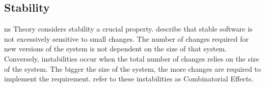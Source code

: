 \subsection{Stability} \label{subsec_on_stability}

\gls{ns} Theory considers stability a crucial property.
\textcite[269-270]{mannaert_normalized_2016} describe that stable software is not
excessively sensitive to small changes. The number of changes required for new versions of
the system is not dependent on the size of that system. Conversely, instabilities occur
when the total number of changes relies on the size of the system. The bigger the size of
the system, the more changes are required to implement the
requirement.\textcite[271]{mannaert_normalized_2016} refer to these instabilities as
Combinatorial Effects.